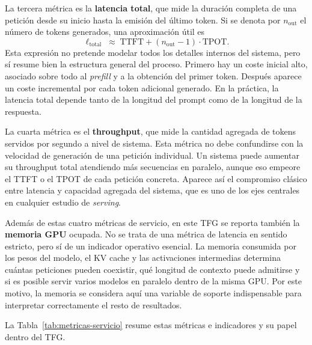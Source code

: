 La tercera métrica es la \textbf{latencia total}, que mide la duración completa de una petición desde su inicio hasta la emisión del último token. Si se denota por $n_{\text{out}}$ el número de tokens generados, una aproximación útil es
\[
\ell_{\text{total}} \;\approx\; \text{TTFT} + (n_{\text{out}} - 1)\cdot \text{TPOT}.
\]
Esta expresión no pretende modelar todos los detalles internos del sistema, pero sí resume bien la estructura general del proceso. Primero hay un coste inicial alto, asociado sobre todo al \textit{prefill} y a la obtención del primer token. Después aparece un coste incremental por cada token adicional generado. En la práctica, la latencia total depende tanto de la longitud del prompt como de la longitud de la respuesta.

La cuarta métrica es el \textbf{throughput}, que mide la cantidad agregada de tokens servidos por segundo a nivel de sistema. Esta métrica no debe confundirse con la velocidad de generación de una petición individual. Un sistema puede aumentar su throughput total atendiendo más secuencias en paralelo, aunque eso empeore el TTFT o el TPOT de cada petición concreta. Aparece así el compromiso clásico entre latencia y capacidad agregada del sistema, que es uno de los ejes centrales en cualquier estudio de \textit{serving}.

Además de estas cuatro métricas de servicio, en este TFG se reporta también la \textbf{memoria GPU} ocupada. No se trata de una métrica de latencia en sentido estricto, pero sí de un indicador operativo esencial. La memoria consumida por los pesos del modelo, el KV cache y las activaciones intermedias determina cuántas peticiones pueden coexistir, qué longitud de contexto puede admitirse y si es posible servir varios modelos en paralelo dentro de la misma GPU. Por este motivo, la memoria se considera aquí una variable de soporte indispensable para interpretar correctamente el resto de resultados.

La Tabla~\ref{tab:metricas-servicio} resume estas métricas e indicadores y su papel dentro del TFG.

